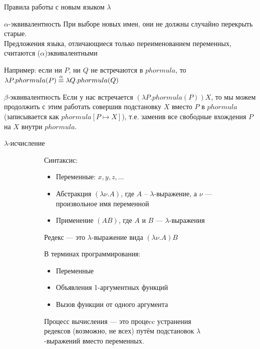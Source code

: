 \begin{frame}{Правила работы с новым языком $\lambda$}
\begin{block}{$\alpha$-эквивалентность}
При выборе новых имен, они не должны случайно перекрыть старые.\\
Предложения языка, отличающиеся только переименованием переменных, считаются ($\alpha$)эквивалентными
\end{block}
Например:  если ни $P$, ни $Q$ не встречаются в $phormula$, то $\lambda P. phormula(P)  \overset{\alpha}{\equiv}{} \lambda Q. phormula(Q) $

\begin{block}{$\beta$-эквивалентность}
Если у нас встречается $(\lambda P. phormula(P))X$, то мы можем продолжить с этим работать совершив подстановку $X$ вместо $P$ в $phormula$ (записывается как $phormula[P\mapsto X]$), т.е. заменив все свободные вхождения $P$ на $X$ внутри $phormula$.
\end{block}
\end{frame}


\begin{frame}{$\lambda$-исчисление}
\begin{figure}[t]
  \begin{subfigure}[t]{0.45\textwidth}
    \vspace{-1em}
Синтаксис:
\begin{itemize}
  \item Переменные: $x,y,z,\dots$
  \item Абстракция $(\lambda \nu. A)$, где $A$ -- $\lambda$-выражение, а $\nu$ --- произвольное имя переменной
  \item Применение $(AB)$, где $A$ и $B$ --- $\lambda$-выражения
\end{itemize}
\begin{definition}{Редекс}
  --- это $\lambda$-выражение вида $(\lambda \nu. A)B$
\end{definition}
  \end{subfigure}
\hspace{1cm}
  \begin{subfigure}[t]{0.45\textwidth}
В терминах программирования:
\begin{itemize}
  \item Переменные
  \item Объявления 1-аргументных функций
  \item Вызов функции от одного аргумента
\end{itemize}
    \vspace{1em}
Процесс вычисления --- это процеcc устранения редексов (возможно, не всех) путём подстановок $\lambda$-выражений вместо переменных.
  \end{subfigure}
\end{figure}
\end{frame}

